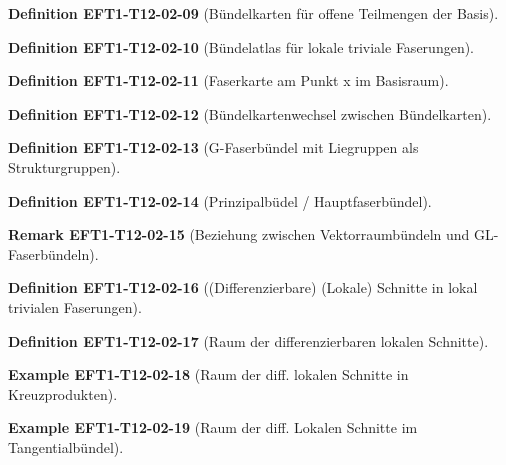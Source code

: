 \documentclass[10pt, letterpaper]{article}
\newcommand{\CustomHeading}[3]{%
  \par\medskip\noindent%
  \textbf{#1 #2} \textnormal{(#3)}.\enskip%
}
\newenvironment{DEF}[2]{\CustomHeading{Definition}{#1}{#2}}{}
\newenvironment{REM}[2]{\CustomHeading{Remark}{#1}{#2}}{}
\newenvironment{EXA}[2]{\CustomHeading{Example}{#1}{#2}}{}
\begin{document}
\begin{DEF}{EFT1-T12-02-09}{Bündelkarten für offene Teilmengen der Basis}
\end{DEF}

\begin{DEF}{EFT1-T12-02-10}{Bündelatlas für lokale triviale Faserungen}
\end{DEF}

\begin{DEF}{EFT1-T12-02-11}{Faserkarte am Punkt x im Basisraum}
\end{DEF}

\begin{DEF}{EFT1-T12-02-12}{Bündelkartenwechsel zwischen Bündelkarten}
\end{DEF}

\begin{DEF}{EFT1-T12-02-13}{G-Faserbündel mit Liegruppen als Strukturgruppen}
\end{DEF}

\begin{DEF}{EFT1-T12-02-14}{Prinzipalbüdel / Hauptfaserbündel}
\end{DEF}

\begin{REM}{EFT1-T12-02-15}{Beziehung zwischen Vektorraumbündeln und GL-Faserbündeln}
\end{REM}

\begin{DEF}{EFT1-T12-02-16}{(Differenzierbare) (Lokale) Schnitte in lokal trivialen Faserungen}
\end{DEF}

\begin{DEF}{EFT1-T12-02-17}{Raum der differenzierbaren lokalen Schnitte}
\end{DEF}

\begin{EXA}{EFT1-T12-02-18}{Raum der diff. lokalen Schnitte in Kreuzprodukten}
\end{EXA}

\begin{EXA}{EFT1-T12-02-19}{Raum der diff. Lokalen Schnitte im Tangentialbündel}
\end{EXA}
\end{document}

